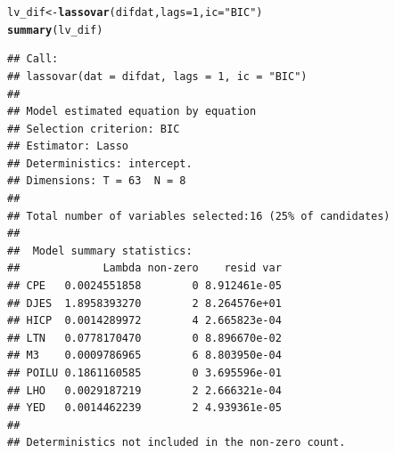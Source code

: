 \documentclass[11pt,oneside, a4paper]{amsart}\usepackage[]{graphicx}\usepackage[]{color}
\makeatletter
\newcommand{\hlnum}[1]{\textcolor[rgb]{0.686,0.059,0.569}{#1}}%
\newcommand{\hlstr}[1]{\textcolor[rgb]{0.192,0.494,0.8}{#1}}%
\newcommand{\hlstd}[1]{\textcolor[rgb]{0.345,0.345,0.345}{#1}}%
\newcommand{\hlkwb}[1]{\textcolor[rgb]{0.69,0.353,0.396}{#1}}%
\newcommand{\hlkwc}[1]{\textcolor[rgb]{0.333,0.667,0.333}{#1}}%
\newcommand{\hlkwd}[1]{\textcolor[rgb]{0.737,0.353,0.396}{\textbf{#1}}}%
\newenvironment{kframe}{%
 \def\at@end@of@kframe{}%
 \ifinner\ifhmode%
  \def\at@end@of@kframe{\end{minipage}}%
  \begin{minipage}{\columnwidth}%
 \fi\fi%
 \def\FrameCommand##1{\hskip\@totalleftmargin \hskip-\fboxsep
 \colorbox{shadecolor}{##1}\hskip-\fboxsep
     \hskip-\linewidth \hskip-\@totalleftmargin \hskip\columnwidth}%
 \MakeFramed {\advance\hsize-\width
   \@totalleftmargin\z@ \linewidth\hsize
   \@setminipage}}%
 {\par\unskip\endMakeFramed%
 \at@end@of@kframe}
\newenvironment{knitrout}{}{} %
\makeatother
\begin{document}
\begin{knitrout}
\begin{kframe}
\begin{alltt}
\hlstd{lv_dif}\hlkwb{<-}\hlkwd{lassovar}\hlstd{(difdat,}\hlkwc{lags}\hlstd{=}\hlnum{1}\hlstd{,} \hlkwc{ic}\hlstd{=}\hlstr{"BIC"}\hlstd{)}
\hlkwd{summary}\hlstd{(lv_dif)}
\end{alltt}
\begin{verbatim}
## Call:
## lassovar(dat = difdat, lags = 1, ic = "BIC")
## 
## Model estimated equation by equation
## Selection criterion: BIC
## Estimator: Lasso
## Deterministics: intercept.
## Dimensions: T = 63  N = 8
## 
## Total number of variables selected:16 (25% of candidates)
## 
##  Model summary statistics:
##             Lambda non-zero    resid var
## CPE   0.0024551858        0 8.912461e-05
## DJES  1.8958393270        2 8.264576e+01
## HICP  0.0014289972        4 2.665823e-04
## LTN   0.0778170470        0 8.896670e-02
## M3    0.0009786965        6 8.803950e-04
## POILU 0.1861160585        0 3.695596e-01
## LHO   0.0029187219        2 2.666321e-04
## YED   0.0014462239        2 4.939361e-05
## 
## Deterministics not included in the non-zero count.
\end{verbatim}
\end{kframe}
\end{knitrout}
\end{document}
